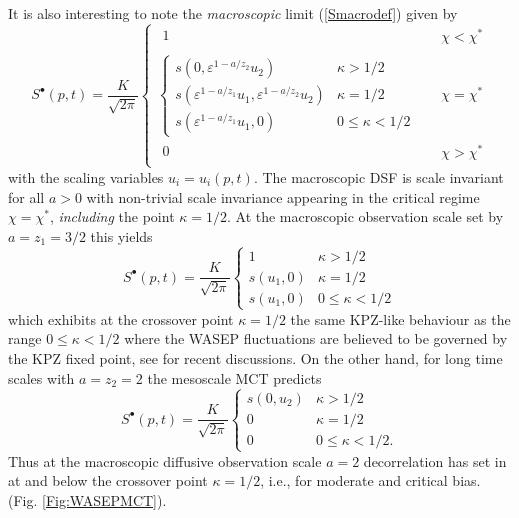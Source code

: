 \documentclass[12pt]{article}
\begin{document}
It is also interesting to note
 the {\it macroscopic} limit (\ref{Smacrodef}) given by 
\begin{equation}
S^{\bullet}(p,t) = \frac{K}{\sqrt{2\pi}} \left\{
\begin{array}{ll}
\begin{array}{ll}
1 &  \\
\end{array}  & \quad \chi < \chi^\ast \\[2mm]
\left\{
\begin{array}{ll}
s(0,\varepsilon^{1-a/z_2} u_2) 
& \kappa > 1/2 \\
s(\varepsilon^{1-a/z_1} u_1,\varepsilon^{1-a/z_2} u_2) 
& \kappa = 1/2 \\
s(\varepsilon^{1-a/z_1} u_1,0) 
& 0 \leq \kappa < 1/2 
\end{array} \right. & \quad \chi = \chi^\ast  \\[6mm]
\begin{array}{ll}
0 &  \\
\end{array}  & \quad \chi > \chi^\ast
\end{array} \right. 
\label{MCTmacrosol}
\end{equation}
with the scaling variables $u_i = u_i(p,t)$. 
The macroscopic DSF is scale invariant for all 
$a>0$ with non-trivial scale invariance appearing in the critical regime $\chi = \chi^\ast$, {\it including} the point $\kappa=1/2$. At the 
macroscopic observation scale set by $a=z_1=3/2$ 
this yields
\begin{equation}
S^{\bullet}(p,t) = 
\frac{K}{\sqrt{2\pi}} \left\{
\begin{array}{ll}
1  & \kappa > 1/2 \\
s(u_1,0) & \kappa = 1/2 \\
s(u_1,0) & 0 \leq \kappa < 1/2
\end{array} \right. 
\end{equation}
which exhibits at the crossover point $\kappa=1/2$ the same KPZ-like
behaviour as the range $0\leq \kappa<1/2$ where the
WASEP fluctuations are believed to be governed by the
KPZ fixed point, see \cite{Mate21,Quas23} for recent discussions.
On the other hand, for long time
scales with $a=z_2=2$ the mesoscale MCT predicts
\begin{equation}
S^{\bullet}(p,t) = 
\frac{K}{\sqrt{2\pi}} \left\{
\begin{array}{ll}
s(0,u_2) & \kappa > 1/2 \\
0 & \kappa = 1/2 \\
0 & 0 \leq \kappa < 1/2.
\end{array} \right. 
\end{equation}
Thus at the macroscopic diffusive observation scale $a=2$ decorrelation has set in 
at and below the crossover
point $\kappa=1/2$, i.e., for moderate and critical bias.
(Fig. \ref{Fig:WASEPMCT}).
\end{document}
